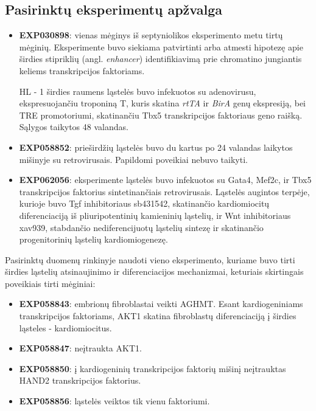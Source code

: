 \documentclass[12pt]{article}
\begin{document}
\subsection{Pasirinktų eksperimentų apžvalga}
\begin{itemize}
    \item \textbf{EXP030898}: vienas mėginys iš septyniolikos eksperimento
        metu tirtų mėginių. Eksperimente buvo siekiama patvirtinti arba
        atmesti hipotezę apie širdies stipriklių (angl. \emph{enhancer})
        identifikiavimą prie chromatino jungiantis keliems transkripcijos
        faktoriams.

        HL - 1 širdies raumens ląstelės buvo infekuotos
        su adenovirusu, ekspresuojančiu troponiną T, kuris skatina \emph{rtTA} ir
        \emph{BirA} genų ekspresiją, bei TRE promotoriumi, skatinančiu Tbx5
        transkripcijos faktoriaus geno raišką. Sąlygos taikytos 48 valandas.
    \item \textbf{EXP058852}: prieširdžių ląstelės buvo du kartus po 24
        valandas laikytos mišinyje su retrovirusais. Papildomi poveikiai nebuvo
        taikyti.
    \item \textbf{EXP062056}: eksperimente ląstelės buvo infekuotos su
        Gata4, Mef2c, ir Tbx5 transkripcijos faktorius sintetinančiais
        retrovirusais. Ląstelės augintos terpėje, kurioje buvo {Tgf\textbeta}
        inhibitoriaus sb431542, skatinančio kardiomiocitų diferenciaciją
        iš pliuripotentinių kamieninių ląstelių, ir Wnt inhibitoriaus
        xav939, stabdančio nediferencijuotų ląstelių sintezę ir
        skatinančio progenitorinių ląstelių kardiomiogenezę.
\end{itemize}

Pasirinktų duomenų rinkinyje naudoti vieno eksperimento, kuriame buvo
tirti širdies ląstelių atsinaujinimo ir diferenciacijos mechanizmai,
keturiais skirtingais poveikiais tirti mėginiai:

\begin{itemize}
    \item \textbf{EXP058843}: embrionų fibroblastai veikti AGHMT. Esant
        kardiogeniniams transkripcijos faktoriams, AKT1 skatina fibroblastų
        diferenciaciją į širdies ląsteles - kardiomiocitus.
    \item \textbf{EXP058847}: neįtraukta AKT1.
    \item \textbf{EXP058850}: į kardiogeninių transkripcijos faktorių mišinį
        neįtrauktas HAND2 transkripcijos faktorius.
    \item \textbf{EXP058856}: ląstelės veiktos tik vienu faktoriumi.
  \end{itemize}
\newpage
\end{document}
